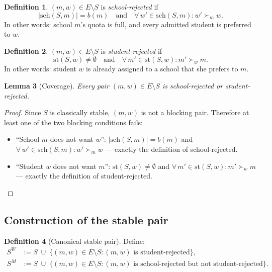 \documentclass[12pt, a4paper]{article}
\theoremstyle{definition}
\newtheorem{definition}{Definition}[section]
\theoremstyle{plain}
\newtheorem{lemma}[definition]{Lemma}
\theoremstyle{remark}
\newcommand{\SM}{S^M}
\newcommand{\SW}{S^W}
\newcommand{\school}[2]{\mathrm{sch}(#1,#2)}
\newcommand{\stud}[2]{\mathrm{st}(#1,#2)}
\newcommand{\quota}{b}
\begin{document}
\begin{definition}
$(m, w) \in E \setminus S$ is \emph{school-rejected} if
\[
  |\school{S}{m}| = \quota(m) \quad\text{and}\quad
  \forall\, w' \in \school{S}{m} : w' \succ_m w.
\]
In other words: school $m$'s quota is full, and every admitted student is
preferred to $w$.
\end{definition}

\begin{definition}
$(m, w) \in E \setminus S$ is \emph{student-rejected} if
\[
  \stud{S}{w} \neq \emptyset \quad\text{and}\quad
  \forall\, m' \in \stud{S}{w} : m' \succ_w m.
\]
In other words: student $w$ is already assigned to a school that she prefers
to $m$.
\end{definition}

\begin{lemma}[Coverage]
\label{lem:coverage}
Every pair $(m, w) \in E \setminus S$ is school-rejected or student-rejected.
\end{lemma}
\begin{proof}
Since $S$ is classically stable, $(m, w)$ is not a blocking pair. Therefore
at least one of the two blocking conditions fails:
\begin{itemize}
  \item ``School $m$ does not want $w$'': $|\school{S}{m}| = \quota(m)$ and
    $\forall\, w' \in \school{S}{m} : w' \succ_m w$ --- exactly the definition
    of school-rejected.
  \item ``Student $w$ does not want $m$'': $\stud{S}{w} \neq \emptyset$ and
    $\forall\, m' \in \stud{S}{w} : m' \succ_w m$ --- exactly the definition
    of student-rejected.\qedhere
\end{itemize}
\end{proof}

\subsection{Construction of the stable pair}

\begin{definition}[Canonical stable pair]
\label{def:canonical}
Define:
\begin{align}
  \SW &:= S \;\cup\; \{(m,w) \in E \setminus S : (m,w)\text{ is student-rejected}\},
  \label{eq:SW}\\
  \SM &:= S \;\cup\; \{(m,w) \in E \setminus S : (m,w)\text{ is school-rejected
    but not student-rejected}\}.
  \label{eq:SM}
\end{align}
\end{definition}
\end{document}
